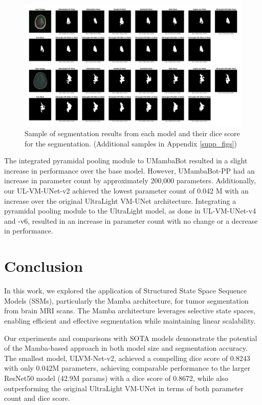 \documentclass[conference]{IEEEtran}
\begin{document}
\begin{figure}[ht]
    \centering
    \includegraphics[width=\columnwidth]{imgs/tumor_seg_ex.png}
    \caption{Sample of segmentation results from each model and their dice score for the segmentation. (Additional samples in Appendix \ref{supp_figs})}
    \label{fig:segs}
\end{figure}

The integrated pyramidal pooling module to UMambaBot resulted in a slight increase in performance over the base model. However, UMambaBot-PP had an increase in parameter count by approximately 200,000 parameters. Additionally, our UL-VM-UNet-v2 achieved the lowest parameter count of 0.042 M with an increase over the original UltraLight VM-UNet architecture. Integrating a pyramidal pooling module to the UltraLight model, as done in UL-VM-UNet-v4 and -v6, resulted in an increase in parameter count with no change or a decrease in performance. 


\section{Conclusion}

In this work, we explored the application of Structured State Space Sequence Models (SSMs), particularly the Mamba architecture, for tumor segmentation from brain MRI scans. The Mamba architecture leverages selective state spaces, enabling efficient and effective segmentation while maintaining linear scalability.

Our experiments and comparisons with SOTA models demonstrate the potential of the Mamba-based approach in both model size and segmentation accuracy. The smallest model, ULVM-Net-v2, achieved a compelling dice score of 0.8243 with only 0.042M parameters, achieving comparable performance to the larger ResNet50 model (42.9M params) with a dice score of 0.8672, while also outperforming the original UltraLight VM-UNet in terms of both parameter count and dice score.
\end{document}
